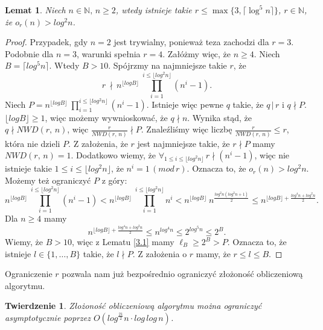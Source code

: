 \documentclass[declaration,shortabstract]{iithesis}
\theoremstyle{definition}
\theoremstyle{remark} \newtheorem{observation}{Obserwacja}
\theoremstyle{plain} \newtheorem{theorem}{Twierdzenie}
\theoremstyle{plain} \newtheorem{lemma}{Lemat}
\theoremstyle{remark} \newtheorem*{remark*}{Uwaga}
\theoremstyle{reminder} \newtheorem*{reminder*}{Przypomnienie}
\begin{document}
\begin{lemma}\label{r_szacowanie}
	Niech $n \in \mathbb{N}, \, n \geq 2$, wtedy istnieje takie $r \leq \max \{3, \lceil\log^5n\rceil \}$, $r \in \mathbb{N}$, że $o_r(n) > log^2n$.
\end{lemma}
	
\begin{proof}
	Przypadek, gdy $n=2$ jest trywialny, ponieważ teza zachodzi dla $r=3$. Podobnie dla $n=3$, warunki spełnia $r=4$.\newline
	Załóżmy więc, że $n \geq 4$. Niech $B = \lceil log^5n \rceil$. Wtedy $B > 10$. \newline
	Spójrzmy na najmniejsze takie $r$, że \[ r \, \nmid \, n^{\lfloor log B \rfloor} \: \prod_{i=1}^{i \leq \lfloor log^2 n \rfloor}(n^i - 1).\]
	Niech $P = n^{\lfloor log B \rfloor} \: \prod_{i=1}^{i \leq \lfloor log^2 n \rfloor}(n^i - 1)$. 
	Istnieje więc pewne $q$ takie, że $q \, | \, r$ i $q \nmid P$. $\lfloor log B \rfloor \geq 1$, więc możemy wywnioskować, że $q \nmid n$. Wynika stąd, że $q \nmid NWD(r,\, n)$, więc $\frac{r}{NWD(r, \, n)} \nmid P$. Znaleźliśmy więc liczbę $\frac{r}{NWD(r, \, n)} \leq r$, która nie dzieli $P$. Z założenia, że $r$ jest najmniejsze takie, że $r \nmid P$ mamy $NWD(r, \, n) = 1$.\newline
	Dodatkowo wiemy, że $\forall_{1 \leq i \leq \lfloor log^2 n \rfloor} \, r \nmid (n^i - 1)$, więc nie istnieje takie $1 \leq i \leq \lfloor log^2 n \rfloor$, że $n^i = 1 \, (mod \, r)$. Oznacza to, że $o_r(n) > log^2n$.
	Możemy też ograniczyć $P$ z góry:
	\[n^{\lfloor log B \rfloor} \: \prod_{i=1}^{i \leq \lfloor log^2 n \rfloor}(n^i - 1) < n^{\lfloor log B \rfloor} \: \prod_{i=1}^{i \leq \lfloor log^2 n \rfloor}n^i <  n^{\lfloor log B \rfloor} \: n^{\frac{log^2n(log^2n + 1)}{2}} \leq n^{{\lfloor log B \rfloor} + \frac{log^4n + log^2n}{2}}.\]
	Dla $n \geq 4$ mamy\[n^{{\lfloor log B \rfloor} + \frac{log^4n + log^2n}{2}} \leq n^{log^4n} \leq 2^{log^5n} \leq 2^B.\]
	Wiemy, że $B > 10$, więc z Lematu \ref{3.1} mamy $\ell_B \geq 2^B > P$. Oznacza to, że istnieje $l \in \{1, \dots, B\}$ takie, że $l \nmid P$. Z założenia o $r$ mamy, że $r \leq l \leq B$.
\end{proof}

Ograniczenie $r$ pozwala nam już bezpośrednio ograniczyć złożoność obliczeniową algorytmu.

\begin{theorem}
	Złożoność obliczeniową algorytmu można ograniczyć asymptotycznie poprzez $O(log^{\frac{21}{2}}n \cdot log \, log \, n)$.
\end{theorem}
	
\end{document}
